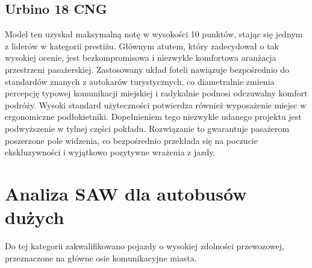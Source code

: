 \subsection{Urbino 18 CNG}
Model ten uzyskał maksymalną notę w wysokości 10 punktów, stając się jednym z liderów w kategorii prestiżu. Głównym atutem, który zadecydował o tak wysokiej ocenie, jest bezkompromisowa i niezwykle komfortowa aranżacja przestrzeni pasażerskiej. Zastosowany układ foteli nawiązuje bezpośrednio do standardów znanych z autokarów turystycznych, co diametralnie zmienia percepcję typowej komunikacji miejskiej i radykalnie podnosi odczuwalny komfort podróży. Wysoki standard użyteczności potwierdza również wyposażenie miejsc w ergonomiczne podłokietniki. Dopełnieniem tego niezwykle udanego projektu jest podwyższenie w tylnej części pokładu. Rozwiązanie to gwarantuje pasażerom poszerzone pole widzenia, co bezpośrednio przekłada się na poczucie ekskluzywności i wyjątkowo pozytywne wrażenia z jazdy.

\section{Analiza SAW dla autobusów dużych}

Do tej kategorii zakwalifikowano pojazdy o wysokiej zdolności przewozowej, przeznaczone na główne osie komunikacyjne miasta.

